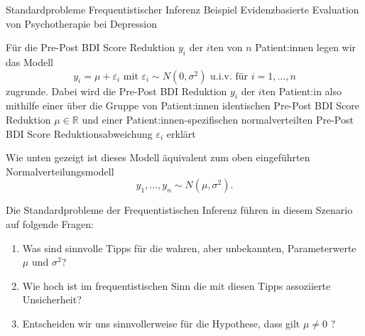 \documentclass[
  8pt,
  ignorenonframetext,
]{beamer}
\providecommand{\tightlist}{%
  \setlength{\itemsep}{0pt}\setlength{\parskip}{0pt}}
\begin{document}
\begin{frame}[t]{Standardprobleme Frequentistischer Inferenz}
\protect\hypertarget{standardprobleme-frequentistischer-inferenz-5}{}
Beispiel \textbar{} Evidenzbasierte Evaluation von Psychotherapie bei
Depression \vspace{2mm}

\small

Für die Pre-Post BDI Score Reduktion \(y_i\) der \(i\)ten von \(n\)
Patient:innen legen wir das Modell \begin{equation}
y_{i} = \mu + \varepsilon_{i} \mbox{ mit } \varepsilon_{i} \sim N(0,\sigma^2) \mbox{ u.i.v. für } i = 1,...,n
\end{equation} zugrunde. Dabei wird die Pre-Post BDI Reduktion \(y_i\)
der \(i\)ten Patient:in also mithilfe einer über die Gruppe von
Patient:innen identischen Pre-Post BDI Score Reduktion
\(\mu \in \mathbb{R}\) und einer Patient:innen-spezifischen
normalverteilten Pre-Post BDI Score Reduktionsabweichung
\(\varepsilon_{i}\) erklärt

Wie unten gezeigt ist dieses Modell äquivalent zum oben eingeführten
Normalverteilungsmodell \begin{equation}
y_1,...,y_n \sim N(\mu,\sigma^2).
\end{equation}

Die Standardprobleme der Frequentistischen Inferenz führen in diesem
Szenario auf folgende Fragen:

\begin{enumerate}
[(1)]
\tightlist
\item
  Was sind sinnvolle Tipps für die wahren, aber unbekannten,
  Parameterwerte \(\mu\) und \(\sigma^2\)?
\item
  Wie hoch ist im frequentistischen Sinn die mit diesen Tipps
  assoziierte Unsicherheit?
\item
  Entscheiden wir uns sinnvollerweise für die Hypothese, dass gilt
  \(\mu\neq 0\) ?
\end{enumerate}
\end{frame}
\end{document}
